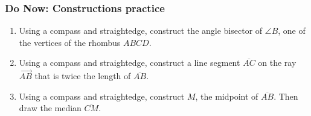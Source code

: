 \documentclass[12pt, twoside]{article}
\begin{document}
\subsubsection*{Do Now: Constructions practice}
 \begin{enumerate}

   \item Using a compass and straightedge, construct the angle bisector of $\angle B$, one of the vertices of the rhombus $ABCD$.\vspace{2cm}
       \begin{center}
     \end{center} \vspace{2cm}

     \item Using a compass and straightedge, construct a line segment $\overline{AC}$ on the ray $\overrightarrow{AB}$ that is twice the length of $\overline{AB}$.\vspace{3cm}
         \begin{center}
       \end{center}

  \newpage

  \item Using a compass and straightedge, construct $M$, the midpoint of $\overline{AB}$. Then draw the median $\overline{CM}$.
  \vspace{2cm}
      \begin{center}
      \begin{tikzpicture}[scale=1.2]


\end{tikzpicture}
\end{center}
\end{enumerate}
\end{document}
